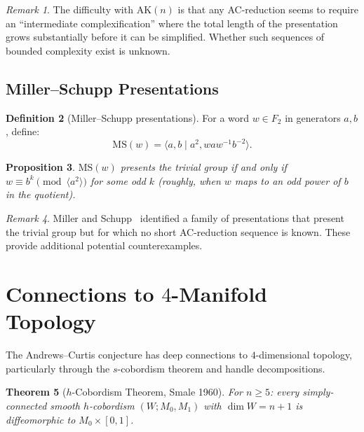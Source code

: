 \documentclass[12pt,a4paper]{amsart}
\newtheorem{theorem}{Theorem}[section]
\newtheorem{proposition}[theorem]{Proposition}
\theoremstyle{definition}
\newtheorem{definition}[theorem]{Definition}
\theoremstyle{remark}
\newtheorem{remark}[theorem]{Remark}
\begin{document}
\begin{remark}
The difficulty with $\mathrm{AK}(n)$ is that any AC-reduction seems to require
an ``intermediate complexification'' where the total length of the presentation
grows substantially before it can be simplified. Whether such sequences of
bounded complexity exist is unknown.
\end{remark}

\subsection{Miller--Schupp Presentations}

\begin{definition}[Miller--Schupp presentations]\label{def:MS}
For a word $w \in F_2$ in generators $a, b$, define:
\[
  \mathrm{MS}(w) = \langle a, b \mid a^2, w a w^{-1} b^{-2} \rangle.
\]
\end{definition}

\begin{proposition}
$\mathrm{MS}(w)$ presents the trivial group if and only if $w \equiv b^k \pmod{\langle a^2 \rangle}$
for some odd $k$ (roughly, when $w$ maps to an odd power of $b$ in the quotient).
\end{proposition}

\begin{remark}
Miller and Schupp~\cite{MS99} identified a family of presentations that present
the trivial group but for which no short AC-reduction sequence is known. These
provide additional potential counterexamples.
\end{remark}

\section{Connections to \texorpdfstring{$4$}{4}-Manifold Topology}

The Andrews--Curtis conjecture has deep connections to $4$-dimensional topology,
particularly through the $s$-cobordism theorem and handle decompositions.

\begin{theorem}[$h$-Cobordism Theorem, Smale 1960]\label{thm:hcobord}
For $n \geq 5$: every simply-connected smooth $h$-cobordism $(W; M_0, M_1)$
with $\dim W = n+1$ is diffeomorphic to $M_0 \times [0,1]$.
\end{theorem}
\end{document}
